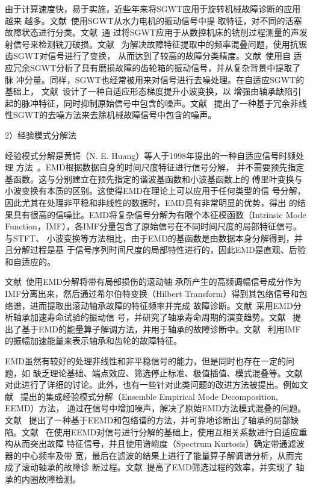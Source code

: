 由于计算速度快，易于实施，近些年来将SGWT应用于旋转机械故障诊断的应用越来
越多。文献~使用SGWT从水力电机的振动信号中提
取特征，对不同的活塞故障状态进行分类。文献~通
过将SGWT应用于从数控机床的铣削过程测量的声发射信号来检测铣刀破损。文献~
为解决故障特征提取中的频率混叠问题，使用抗锯齿SGWT对信号进行了变换，
从而达到了较高的故障分类精度。文献~使用自
适应冗余SGWT分析了具有磨损故障的齿轮箱的振动信号，并从复杂背景中提取了脉
冲分量。同样，SGWT也经常被用来对信号进行去噪处理。在自适应SGWT的基础上，
文献~设计了一种自适应形态梯度提升小波变换，以
增强由轴承缺陷引起的脉冲特征，同时抑制原始信号中包含的噪声。文献~
提出了一种基于冗余非线性SGWT的去噪方法来去除机械故障信号中包含的噪声。

2）经验模式分解法

经验模式分解是黄锷（N. E. Huang）等人于1998年提出的一种自适应信号时频处理
方法~\cite{huang1998empirical}。EMD根据数据自身的时间尺度特征进行信号分解，
并不需要预先指定基函数。这与分别建立在预先指定的谐波基函数和小波基函数上的
傅里叶变换与小波变换有本质的区别。这使得EMD在理论上可以应用于任何类型的信
号分解，因此尤其在处理非平稳和非线性的数据时，EMD具有非常明显的优势，得出
的结果具有很高的信噪比。EMD将复杂信号分解为有限个本征模函数（Intrinsic Mode
Function，IMF），各IMF分量包含了原始信号在不同时间尺度的局部特征信号。与STFT、
小波变换等方法相比，由于EMD的基函数是由数据本身分解得到，并且分解过程是基
于信号序列时间尺度的局部特性进行的，因此EMD是直观、后验和自适应的。

文献~使用EMD分解将带有局部损伤的滚动轴
承所产生的高频调幅信号成分作为IMF分离出来，然后通过希尔伯特变换（Hilbert
Transform）得到其包络信号和包络谱，进而提取出滚动轴承故障的特征频率并完成
故障诊断。文献~采用EMD分析轴承加速寿命试验的振动信
号，并研究了轴承寿命周期的演变趋势。文献~
提出了基于EMD的能量算子解调方法，并用于轴承的故障诊断中。文献~
利用IMF的振幅加速能量来表示轴承和齿轮的故障特征。

EMD虽然有较好的处理非线性和非平稳信号的能力，但是同时也存在一定的问题，如
缺乏理论基础、端点效应、筛选停止标准、极值插值、模式混叠等。文献~
对此进行了详细的讨论。此外，也有一些针对此类问题的改进方法被提出。例如文献~
提出的集成经验模式分解（Ensemble Empirical Mode Decomposition, EEMD）方法，
通过在信号中增加噪声，解决了原始EMD方法模式混叠的问题。文献~
提出了一种基于EEMD和包络谱的方法，并可靠地诊断出了轴承的局部缺陷。文献~
在使用EEMD对信号进行分解的基础上，使用互相关系数进行自适应重构从而突出故障
特征信号，并且使用谱峭度（Spectrum Kurtosis）确定带通滤波器的中心频率及带
宽，最后在滤波的结果上进行了能量算子解调谱分析，从而完成了滚动轴承的故障诊
断过程。文献~提高了EMD筛选过程的效率，并实现了
轴承的内圈故障检测。

